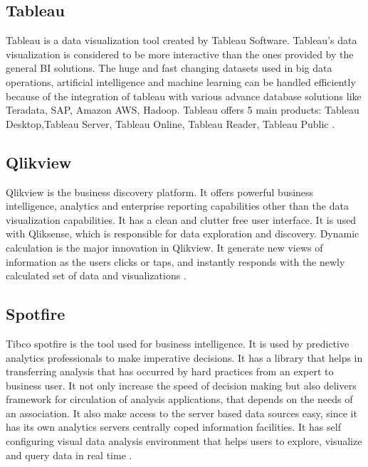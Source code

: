 \subsection*{Tableau}

Tableau is a data visualization tool created by Tableau Software. Tableau’s data visualization is considered to be more interactive than the ones provided by the general BI solutions. The huge and fast changing datasets used in big data operations, artificial intelligence and machine learning can be handled efficiently because of the integration of tableau with various advance database solutions like Teradata, SAP, Amazon AWS, Hadoop. Tableau offers 5 main products: Tableau Desktop,Tableau Server, Tableau Online, Tableau Reader, Tableau Public \cite{Tableau}.\\

\subsection*{Qlikview}

Qlikview is the business discovery platform. It offers powerful business intelligence, analytics and enterprise reporting capabilities other than the data visualization capabilities. It has a clean and clutter free user interface. It is used with Qliksense, which is responsible for data exploration and discovery. Dynamic calculation is the major innovation in Qlikview. It generate new views of information as the users clicks or taps, and instantly responds with the newly calculated set of data and visualizations \cite{Qlikview}.\\

\subsection*{Spotfire}

Tibco spotfire is the tool used for business intelligence. It is used by predictive analytics professionals to make imperative decisions. It has a library that helps in transferring analysis that has occurred by hard practices from an expert to business user. It not only increase the speed of decision making but also delivers framework for circulation of analysis applications, that depends on the needs of an association. It also make access to the server based data sources easy, since it has its own analytics servers centrally coped information facilities. It has self configuring visual data analysis environment that helps users to explore, visualize and query data in real time \cite{Spotfire}.\\

